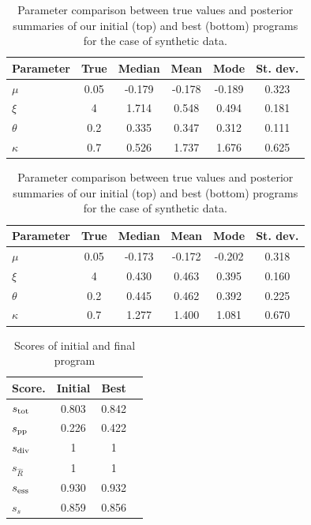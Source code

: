 \documentclass[11pt]{report}
\begin{document}
\begin{table}[htpb]
\centering
\caption{Parameter comparison between true values and posterior summaries of our initial (top) and best (bottom) programs for the case of synthetic data.}
\label{tab:synthetic:parameter-comparison}
\begin{tabular}{lccccc}
\hline
Parameter & True & Median & Mean & Mode & St. dev.\\
\hline
$\mu$     & 0.05 & -0.179 & -0.178 & -0.189 & 0.323 \\
$\xi$     & 4    & 1.714 & 0.548 &  0.494 &  0.181 \\
$\theta$  &  0.2 & 0.335 & 0.347& 0.312 & 0.111\\
$\kappa$  & 0.7  & 0.526 & 1.737 & 1.676 &  0.625 \\
\hline
\end{tabular}

\vspace{0.5em}

\begin{tabular}{lccccc}
\hline
Parameter & True & Median & Mean & Mode & St. dev.\\
\hline
$\mu$ & 0.05 & -0.173 & -0.172 & -0.202& 0.318 \\
$\xi$ & 4 &  0.430 & 0.463 & 0.395& 0.160 \\
$\theta$ &  0.2 & 0.445 &  0.462 & 0.392& 0.225\\
$\kappa$ & 0.7 &  1.277 &  1.400  & 1.081& 0.670\\
\hline
\end{tabular}

\end{table}

\begin{table}
    \centering
\caption{Scores of initial and final program}
\label{tab:synthetic:scores}
\begin{tabular}{lccc}
\hline
Score.                  & Initial & Best\\
\hline
$s_{\rm tot}$           & 0.803   & 0.842  \\
$s_{\rm pp}$            & 0.226   & 0.422\\
$s_{\rm div}$           & 1       & 1\\
$s_{\widehat{R}}$       & 1       & 1\\
$s_{\rm ess}$           & 0.930   & 0.932  \\
$s_s$                   & 0.859   & 0.856 \\
\hline
\end{tabular}
\end{table}
\end{document}
